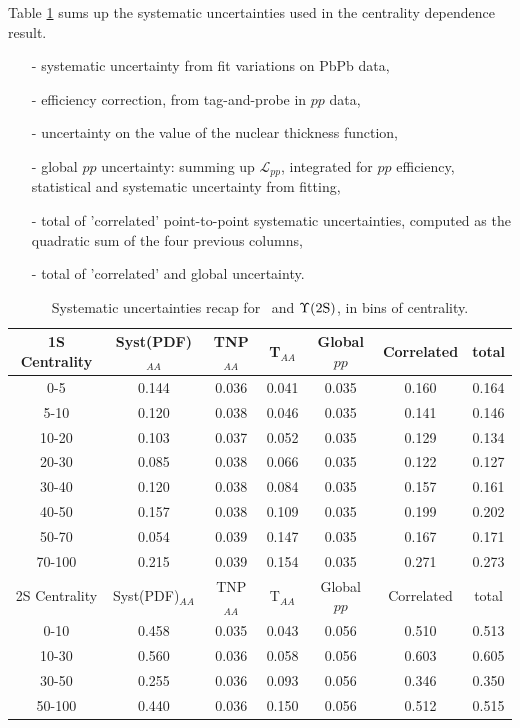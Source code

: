 Table \ref{tab:breakdownPart} sums up the systematic uncertainties
used in the centrality dependence result.
\begin{itemize}
\item[-] systematic uncertainty from fit variations on PbPb data,
\item[-] efficiency correction, from tag-and-probe in
  $pp$ data,
\item[-] uncertainty on the value of the nuclear thickness function,
\item[-] global $pp$ uncertainty: summing up $\mathcal{L}_{pp}$, integrated
  for $pp$ efficiency, statistical and systematic
  uncertainty from fitting,
\item[-] total of 'correlated' point-to-point
  systematic uncertainties, computed as the quadratic sum of the four
  previous columns,
\item[-] total of 'correlated' and global uncertainty.
\end{itemize}
\begin{table}[hbtp]
  \begin{centering}
    \begin{tabular}{|c|c|c|c|c|c|c|}
      \hline
      1S Centrality & Syst(PDF)$_{AA}$ & TNP$_{AA}$ & T$_{AA}$ &
      Global  $pp$ & Correlated & total\\
      \hline
      0-5   &0.144 &0.036 &0.041 &0.035 &0.160 &0.164 \\
      5-10  &0.120 &0.038 &0.046 &0.035 &0.141 &0.146 \\
      10-20 &0.103 &0.037 &0.052 &0.035 &0.129 &0.134\\
      20-30 &0.085 &0.038 &0.066 &0.035 &0.122 &0.127\\
      30-40 &0.120 &0.038 &0.084 &0.035 &0.157 &0.161\\
      40-50 &0.157 &0.038 &0.109 &0.035 &0.199 &0.202\\
      50-70 &0.054 &0.039 &0.147 &0.035 &0.167 &0.171\\
      70-100&0.215 &0.039 &0.154 &0.035 &0.271 &0.273\\
      \hline
      2S Centrality & Syst(PDF)$_{AA}$ & TNP$_{AA}$ & T$_{AA}$ &
      Global  $pp$ & Correlated & total\\
      \hline
      0-10 &  0.458 &0.035 &0.043 &0.056 &0.510 &0.513 \\
      10-30 & 0.560 &0.036 &0.058 &0.056 &0.603 &0.605 \\
      30-50 & 0.255 &0.036 &0.093 &0.056 &0.346 &0.350 \\
      50-100 &0.440 &0.036 &0.150 &0.056 &0.512 &0.515 \\
      \hline
    \end{tabular}
    \caption{Systematic uncertainties recap for \PgUa\ and $\Upsilon\mathrm{(2S)}$, in
      bins of centrality. }  
    \label{tab:breakdownPart}
  \end{centering}
\end{table} 


